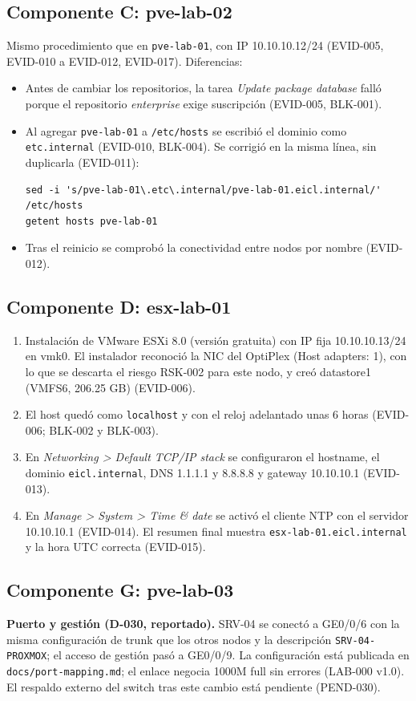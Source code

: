 \documentclass[11pt,a4paper]{article}
\begin{document}
\subsection{Componente C: pve-lab-02}
Mismo procedimiento que en \texttt{pve-lab-01}, con IP 10.10.10.12/24 (EVID-005, EVID-010 a EVID-012, EVID-017). Diferencias:

\begin{itemize}
  \item Antes de cambiar los repositorios, la tarea \emph{Update package database} falló porque el repositorio \emph{enterprise} exige suscripción (EVID-005, BLK-001).
  \item Al agregar \texttt{pve-lab-01} a \texttt{/etc/hosts} se escribió el dominio como \texttt{etc.internal} (EVID-010, BLK-004). Se corrigió en la misma línea, sin duplicarla (EVID-011):
\begin{lstlisting}
sed -i 's/pve-lab-01\.etc\.internal/pve-lab-01.eicl.internal/' /etc/hosts
getent hosts pve-lab-01
\end{lstlisting}
  \item Tras el reinicio se comprobó la conectividad entre nodos por nombre (EVID-012).
\end{itemize}

\subsection{Componente D: esx-lab-01}
\begin{enumerate}
  \item Instalación de VMware ESXi 8.0 (versión gratuita) con IP fija 10.10.10.13/24 en vmk0. El instalador reconoció la NIC del OptiPlex (Host adapters: 1), con lo que se descarta el riesgo RSK-002 para este nodo, y creó datastore1 (VMFS6, 206.25 GB) (EVID-006).
  \item El host quedó como \texttt{localhost} y con el reloj adelantado unas 6 horas (EVID-006; BLK-002 y BLK-003).
  \item En \emph{Networking > Default TCP/IP stack} se configuraron el hostname, el dominio \texttt{eicl.internal}, DNS 1.1.1.1 y 8.8.8.8 y gateway 10.10.10.1 (EVID-013).
  \item En \emph{Manage > System > Time \& date} se activó el cliente NTP con el servidor 10.10.10.1 (EVID-014). El resumen final muestra \texttt{esx-lab-01.eicl.internal} y la hora UTC correcta (EVID-015).
\end{enumerate}

\subsection{Componente G: pve-lab-03}
\textbf{Puerto y gestión (D-030, reportado).} SRV-04 se conectó a GE0/0/6 con la misma configuración de trunk que los otros nodos y la descripción \texttt{SRV-04-PROXMOX}; el acceso de gestión pasó a GE0/0/9. La configuración está publicada en \texttt{docs/port-mapping.md}; el enlace negocia 1000M full sin errores (LAB-000 v1.0). El respaldo externo del switch tras este cambio está pendiente (PEND-030).
\end{document}
